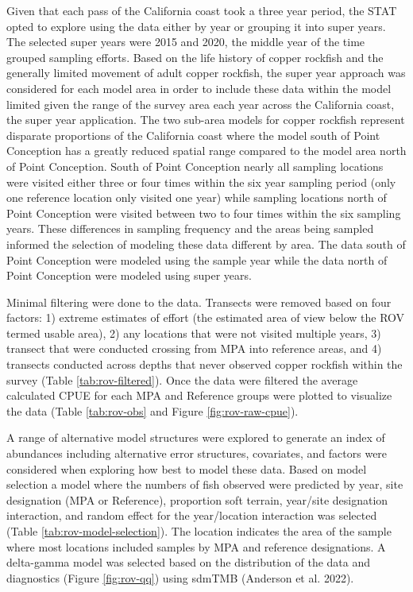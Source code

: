 \documentclass[11pt,
  english,
  letterpaper,
]{article}
\begin{document}
Given that each pass of the California coast took a three year period, the STAT opted to explore using the data either by year or grouping it into super years. The selected super years were 2015 and 2020, the middle year of the time grouped sampling efforts. Based on the life history of copper rockfish and the generally limited movement of adult copper rockfish, the super year approach was considered for each model area in order to include these data within the model limited given the range of the survey area each year across the California coast, the super year application. The two sub-area models for copper rockfish represent disparate proportions of the California coast where the model south of Point Conception has a greatly reduced spatial range compared to the model area north of Point Conception. South of Point Conception nearly all sampling locations were visited either three or four times within the six year sampling period (only one reference location only visited one year) while sampling locations north of Point Conception were visited between two to four times within the six sampling years. These differences in sampling frequency and the areas being sampled informed the selection of modeling these data different by area. The data south of Point Conception were modeled using the sample year while the data north of Point Conception were modeled using super years.

Minimal filtering were done to the data. Transects were removed based on four factors: 1) extreme estimates of effort (the estimated area of view below the ROV termed usable area), 2) any locations that were not visited multiple years, 3) transect that were conducted crossing from MPA into reference areas, and 4) transects conducted across depths that never observed copper rockfish within the survey (Table \ref{tab:rov-filtered}). Once the data were filtered the average calculated CPUE for each MPA and Reference groups were plotted to visualize the data (Table \ref{tab:rov-obs} and Figure \ref{fig:rov-raw-cpue}).

A range of alternative model structures were explored to generate an index of abundances including alternative error structures, covariates, and factors were considered when exploring how best to model these data. Based on model selection a model where the numbers of fish observed were predicted by year, site designation (MPA or Reference), proportion soft terrain, year/site designation interaction, and random effect for the year/location interaction was selected (Table \ref{tab:rov-model-selection}). The location indicates the area of the sample where most locations included samples by MPA and reference designations. A delta-gamma model was selected based on the distribution of the data and diagnostics (Figure \ref{fig:rov-qq}) using sdmTMB (Anderson et al. 2022).
\end{document}
